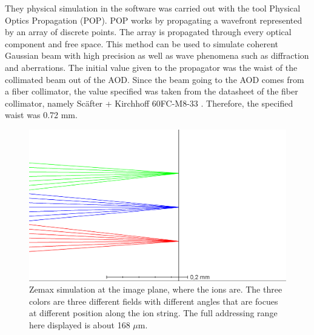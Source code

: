 They physical simulation in the software was carried out with the tool Physical Optics Propagation (POP). POP works by propagating a wavefront represented by an array of discrete points. The array is propagated through every optical component and free space. This method can be used to simulate coherent Gaussian beam with high precision as well as wave phenomena such as diffraction and aberrations. The initial value given to the propagator was the waist of the collimated beam out of the AOD. Since the beam going to the AOD comes from a fiber collimator, the value specified was taken from the datasheet of the fiber collimator, namely Sc\"after + Kirchhoff 60FC-M8-33 \cite{fibercollimator}. Therefore, the specified waist was 0.72 mm.
\begin{figure}
     \centering
     \centering
     \includegraphics[width=.8\textwidth]{img/zemaxrange}
     \caption{Zemax simulation at the image plane, where the ions are. The three colors are three different fields with different angles that are focues at different position along the ion string. The full addressing range here displayed is about 168 $\mu$m.}
     \label{zemaxrange}
\end{figure}

